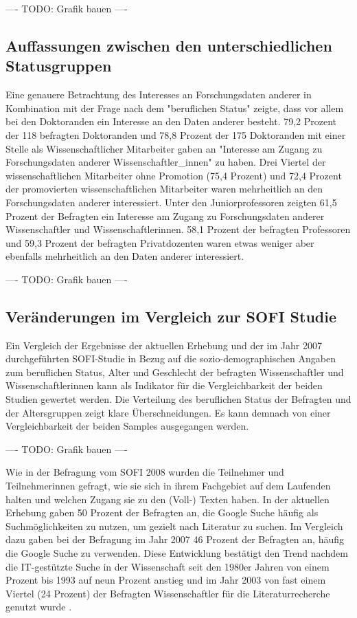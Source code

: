 ---- TODO: Grafik bauen ----

\subsection{Auffassungen zwischen den unterschiedlichen Statusgruppen}

Eine genauere Betrachtung des Interesses an Forschungsdaten anderer in Kombination mit der Frage nach dem "beruflichen Status" zeigte, dass vor allem bei den Doktoranden ein Interesse an den Daten anderer besteht. 79,2 Prozent der 118 befragten Doktoranden und 78,8 Prozent der 175 Doktoranden mit einer Stelle als Wissenschaftlicher Mitarbeiter gaben an "Interesse am Zugang zu Forschungsdaten anderer Wissenschaftler_innen" zu haben. Drei Viertel der wissenschaftlichen Mitarbeiter ohne Promotion (75,4 Prozent) und 72,4 Prozent der promovierten wissenschaftlichen Mitarbeiter waren mehrheitlich an den Forschungsdaten anderer interessiert. Unter den Juniorprofessoren zeigten 61,5 Prozent der Befragten ein Interesse am Zugang zu Forschungsdaten anderer Wissenschaftler und Wissenschaftlerinnen. 58,1 Prozent der befragten Professoren und 59,3 Prozent der befragten Privatdozenten waren etwas weniger aber ebenfalls mehrheitlich an den Daten anderer interessiert.

---- TODO: Grafik bauen ----

\subsection{Veränderungen im Vergleich zur SOFI Studie}

Ein Vergleich der Ergebnisse der aktuellen Erhebung und der im Jahr 2007 durchgeführten SOFI-Studie in Bezug auf die sozio-demographischen Angaben zum beruflichen Status, Alter und Geschlecht der befragten Wissenschaftler und Wissenschaftlerinnen kann als Indikator für die Vergleichbarkeit der beiden Studien gewertet werden. Die Verteilung des beruflichen Status der Befragten und der Altersgruppen zeigt klare Überschneidungen. Es kann demnach von einer Vergleichbarkeit der beiden Samples ausgegangen werden.

---- TODO: Grafik bauen ----

Wie in der Befragung vom SOFI 2008 wurden die Teilnehmer und Teilnehmerinnen gefragt, wie sie sich in ihrem Fachgebiet auf dem Laufenden halten und welchen Zugang sie zu den (Voll-) Texten haben. In der aktuellen Erhebung gaben 50 Prozent der Befragten an, die Google Suche häufig als Suchmöglichkeiten zu nutzen, um gezielt nach Literatur zu suchen. Im Vergleich dazu gaben bei der Befragung im Jahr 2007 46 Prozent der Befragten an, häufig die Google Suche zu verwenden. Diese Entwicklung bestätigt den Trend nachdem die IT-gestützte Suche in der Wissenschaft seit den 1980er Jahren von einem Prozent bis 1993 auf neun Prozent anstieg und im Jahr 2003 von fast einem Viertel (24 Prozent) der Befragten Wissenschaftler für die Literaturrecherche genutzt wurde \cite{hanekop_2008}.

